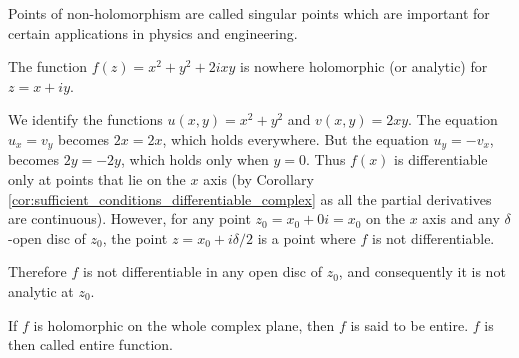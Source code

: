\begin{remark}
Points of non-holomorphism are called singular points which are important for certain applications in physics and engineering.
\end{remark}

\begin{example}
The function $f(z) = x^2 + y^2 + 2ixy$ is nowhere holomorphic (or analytic) for $z = x+ iy$.

We identify the functions $u(x,y) = x^2 + y^2$ and $v(x,y) = 2xy$. The equation $u_x = v_y$ becomes $2x = 2x$, which holds everywhere. But the equation $u_y = -v_x$, becomes $2y = -2y$, which holds only when $y=0$. Thus $f(x)$ is differentiable only at points that lie on the $x$ axis (by Corollary \ref{cor:sufficient_conditions_differentiable_complex} as all the partial derivatives are continuous). However, for any point $z_0 = x_0 + 0i = x_0$ on the $x$ axis and any $\delta$-open disc of $z_0$, the point $z = x_0 + i\delta/2$ is a point where $f$ is not differentiable.

Therefore $f$ is not differentiable in any open disc of $z_0$, and consequently it is not analytic at $z_0$.
\end{example}

\begin{definition}
If $f$ is holomorphic on the whole complex plane, then $f$ is said to be entire. $f$ is then called entire function.
\end{definition}






